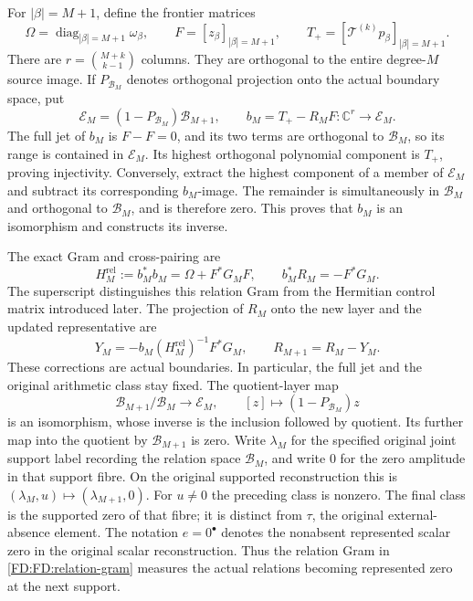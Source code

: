 For \(|\beta|=M+1\), define the frontier matrices
\begin{equation}
\Omega=\operatorname{diag}_{|\beta|=M+1}\omega_\beta,\qquad
F=[z_\beta]_{|\beta|=M+1},\qquad
T_+=[\mathcal T^{(k)}p_\beta]_{|\beta|=M+1}.
\tag{FD.11}\label{FD:FD:frontier}
\end{equation}
There are \(r=\binom{M+k}{k-1}\) columns.  They are orthogonal to the
entire degree-\(M\) source image.  If \(P_{\mathcal B_M}\) denotes
orthogonal projection onto the actual boundary space, put
\begin{equation}
\mathcal E_M=(1-P_{\mathcal B_M})\mathcal B_{M+1},\qquad
b_M=T_+-R_MF:\mathbb C^r\longrightarrow\mathcal E_M.
\tag{FD.12}\label{FD:FD:boundary-map}
\end{equation}
The full jet of \(b_M\) is \(F-F=0\), and its two terms are orthogonal
to \(\mathcal B_M\), so its range is contained in \(\mathcal E_M\).
Its highest orthogonal polynomial component is \(T_+\), proving
injectivity.  Conversely, extract the highest component of a member of
\(\mathcal E_M\) and subtract its corresponding \(b_M\)-image.  The
remainder is simultaneously in \(\mathcal B_M\) and orthogonal to
\(\mathcal B_M\), and is therefore zero.  This proves that \(b_M\) is
an isomorphism and constructs its inverse.

The exact Gram and cross-pairing are
\begin{equation}
H_M^{\mathrm{rel}}:=b_M^*b_M=\Omega+F^*G_MF,
\qquad b_M^*R_M=-F^*G_M.
\tag{FD.13}\label{FD:FD:relation-gram}
\end{equation}
The superscript distinguishes this relation Gram from the Hermitian
control matrix introduced later.  The projection of \(R_M\) onto the
new layer and the updated representative are
\begin{equation}
Y_M=-b_M(H_M^{\mathrm{rel}})^{-1}F^*G_M,
\qquad R_{M+1}=R_M-Y_M.
\tag{FD.14}\label{FD:FD:representative-update}
\end{equation}
These corrections are actual boundaries.  In particular, the full jet and
the original arithmetic class stay fixed.  The quotient-layer map
\[
\mathcal B_{M+1}/\mathcal B_M\longrightarrow\mathcal E_M,
\qquad [z]\longmapsto(1-P_{\mathcal B_M})z
\]
is an isomorphism, whose inverse is the inclusion followed by quotient.
Its further map into the quotient by \(\mathcal B_{M+1}\) is zero.
Write \(\lambda_M\) for the specified original joint support label
recording the relation space \(\mathcal B_M\), and write \(0\) for
the zero amplitude in that support fibre.  On the original supported
reconstruction this is
\((\lambda_M,u)\mapsto(\lambda_{M+1},0)\).  For \(u\ne0\) the preceding
class is nonzero.  The final class is the supported zero of that fibre;
it is distinct from \(\tau\), the original external-absence element.
The notation \(e=0^\bullet\) denotes the nonabsent represented scalar
zero in the original scalar reconstruction.  Thus the relation Gram
in \eqref{FD:FD:relation-gram} measures the actual relations becoming
represented zero at the next support.

